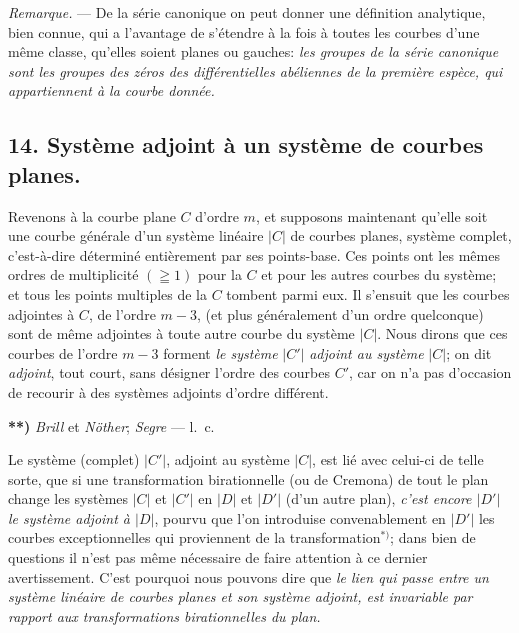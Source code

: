 \documentclass{article}
\begin{document}
\emph{Remarque.} --- De la série canonique on peut donner une définition analytique, bien connue, qui a l'avantage de s'étendre à la fois à toutes les courbes d'une même classe, qu'elles soient planes ou gauches: \emph{les groupes de la série canonique sont les groupes des zéros des différentielles abéliennes de la première espèce, qui appartiennent à la courbe donnée.}

\subsection*{14. Système adjoint à un système de courbes planes.}

Revenons à la courbe plane $C$ d'ordre $m$, et supposons maintenant qu'elle soit une courbe générale d'un système linéaire $|C|$ de courbes planes, système complet, c'est-à-dire déterminé entièrement par ses points-base. Ces points ont les mêmes ordres de multiplicité $(\geqq 1)$ pour la $C$ et pour les autres courbes du système; et tous les points multiples de la $C$ tombent parmi eux. Il s'ensuit que les courbes adjointes à $C$, de l'ordre $m - 3$, (et plus généralement d'un ordre quelconque) sont de même adjointes à toute autre courbe du système $|C|$. Nous dirons que ces courbes de l'ordre $m - 3$ forment \emph{le système} $|C'|$ \emph{adjoint au système} $|C|$; on dit \emph{adjoint}, tout court, sans désigner l'ordre des courbes $C'$, car on n'a pas d'occasion de recourir à des systèmes adjoints d'ordre différent.

\textbf{**)} \emph{Brill} et \emph{Nöther}; \emph{Segre} --- l.\ c.


Le système (complet) $|C'|$, adjoint au système $|C|$, est lié avec celui-ci de telle sorte, que si une transformation birationnelle (ou de Cremona) de tout le plan change les systèmes $|C|$ et $|C'|$ en $|D|$ et $|D'|$ (d'un autre plan), \emph{c'est encore $|D'|$ le système adjoint à $|D|$}, pourvu que l'on introduise convenablement en $|D'|$ les courbes exceptionnelles qui proviennent de la transformation${}^{*)}$; dans bien de questions il n'est pas même nécessaire de faire attention à ce dernier avertissement. C'est pourquoi nous pouvons dire que \emph{le lien qui passe entre un système linéaire de courbes planes et son système adjoint, est invariable par rapport aux transformations birationnelles du plan.}
\end{document}
